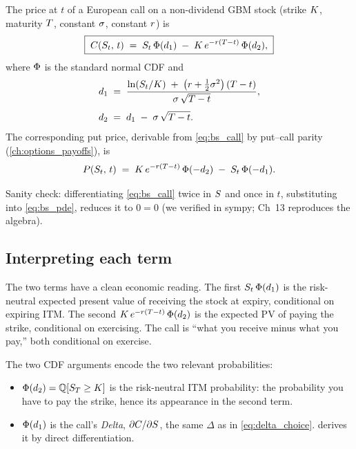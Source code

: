 \begin{keyfactbox}
The price at $t$ of a European call on a non-dividend GBM stock
(strike $K$, maturity $T$, constant $\sigma$,
constant $r$) is
\begin{equation}
  \boxed{\;
    C(S_t,\,t)
    \;=\;
    S_t\,\Phi(d_1)
    \;-\;
    K\,e^{-r(T - t)}\,\Phi(d_2),
  \;}
  \label{eq:bs_call}
\end{equation}
where $\Phi$ is the standard normal CDF and
\begin{align}
  d_1 \;&=\;
  \frac{\ln(S_t/K)
        \;+\; \bigl(r + \tfrac{1}{2}\sigma^2\bigr)\,(T - t)}
       {\sigma\,\sqrt{T - t}},
  \label{eq:bs_d1} \\[0.4em]
  d_2 \;&=\;
  d_1 \;-\; \sigma\,\sqrt{T - t}.
  \label{eq:bs_d2}
\end{align}
The corresponding put price, derivable from \eqref{eq:bs_call}
by put--call parity (\cref{ch:options_payoffs}), is
\begin{equation}
  P(S_t,\,t)
  \;=\;
  K\,e^{-r(T - t)}\,\Phi(-d_2)
  \;-\;
  S_t\,\Phi(-d_1).
  \label{eq:bs_put}
\end{equation}
\end{keyfactbox}

Sanity check: differentiating \eqref{eq:bs_call} twice in
$S$ and once in $t$, substituting into \eqref{eq:bs_pde},
reduces it to $0 = 0$ (we verified in sympy; \citeHull{} Ch~13
reproduces the algebra).

\subsection{Interpreting each term}
\label{subsec:ch15_terms}

The two terms have a clean economic reading. The first
$S_t\,\Phi(d_1)$ is the risk-neutral expected present value
of receiving the stock at expiry, conditional on expiring ITM.
The second $K\,e^{-r(T - t)}\,\Phi(d_2)$ is the
expected PV of paying the strike, conditional on exercising.
The call is ``what you receive minus what you pay,'' both
conditional on exercise.

The two CDF arguments encode the two relevant probabilities:
\begin{itemize}
  \item $\Phi(d_2) = \mathbb{Q}[S_T \geq K]$ is the
  risk-neutral ITM probability: the probability you have to
  pay the strike, hence its appearance in the second term.
  \item $\Phi(d_1)$ is the call's \emph{Delta},
  $\partial C/\partial S$, the same $\Delta$ as in
  \eqref{eq:delta_choice}.  derives it
  by direct differentiation.
\end{itemize}

